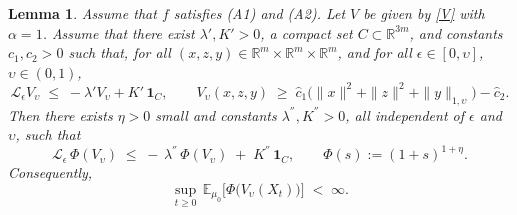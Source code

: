 \documentclass[10pt,a4paper]{amsart}
\newtheorem{lemma}{Lemma}
\newcommand{\R}{\mathbb R}
\begin{document}
\begin{lemma}\label{lem:power-Lyap} Assume that $f$ satisfies \textnormal{(A1)} and \textnormal{(A2)}. Let $V$ be given by \eqref{V} with $\alpha=1$. Assume that there exist
$\lambda',K'>0$, a compact set $C\subset\R^{3m}$, and constants $c_1,c_2>0$ such that, for all $(x,z,y)\in \mathbb{R}^m \times \mathbb{R}^m \times \mathbb{R}^m$, and for all $\epsilon\in [0,\upsilon]$, $\upsilon\in (0,1)$,
\[
{\mathcal L_\epsilon}V_\upsilon \;\le\; -\lambda' V_\upsilon + K'\,\mathbf 1_{C},
\qquad
V_\upsilon(x,z,y)\;\ge\; \hat c_1\bigl(\|x\|^2+\|z\|^2+\|y\|_{1,\upsilon}\bigr)-\hat c_2.
\]
Then there exists $\eta>0$ small and
constants $\lambda^{''}, K^{''}>0$, all independent of $\epsilon$ and $\upsilon$, such that
\begin{equation}\label{eq:power-drift}
{\mathcal L_\epsilon}\,\Phi(V_\upsilon) \;\le\; -\,\lambda^{''}\,\Phi(V_\upsilon)\;+\; K^{''}\,\mathbf 1_{C},
\qquad
\Phi(s):=(1+s)^{1+\eta}.
\end{equation}
Consequently,
\[
\sup_{t\ge0}\,\mathbb E_{\mu_0}\bigl[\Phi\!\bigl(V_\upsilon(X_t)\bigr)\bigr]\;<\;\infty.
\]
\end{lemma}
\end{document}
